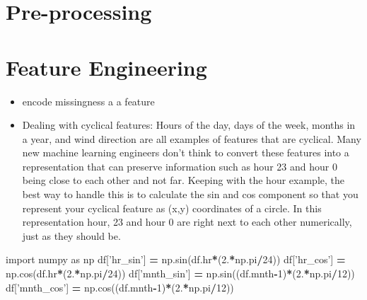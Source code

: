 \documentclass[]{book}
\newenvironment{Shaded}{\begin{snugshade}}{\end{snugshade}}
\newcommand{\DecValTok}[1]{\textcolor[rgb]{0.00,0.00,0.81}{#1}}
\newcommand{\StringTok}[1]{\textcolor[rgb]{0.31,0.60,0.02}{#1}}
\newcommand{\ImportTok}[1]{#1}
\newcommand{\OperatorTok}[1]{\textcolor[rgb]{0.81,0.36,0.00}{\textbf{#1}}}
\newcommand{\NormalTok}[1]{#1}
\theoremstyle{definition}
\theoremstyle{definition}
\theoremstyle{definition}
\theoremstyle{remark}
\begin{document}
\section{Pre-processing}\label{pre-processing}

\section{Feature Engineering}\label{feature-engineering}

\begin{itemize}
\item
  encode missingness a a feature
\item
  Dealing with cyclical features: Hours of the day, days of the week,
  months in a year, and wind direction are all examples of features that
  are cyclical. Many new machine learning engineers don't think to
  convert these features into a representation that can preserve
  information such as hour 23 and hour 0 being close to each other and
  not far. Keeping with the hour example, the best way to handle this is
  to calculate the sin and cos component so that you represent your
  cyclical feature as (x,y) coordinates of a circle. In this
  representation hour, 23 and hour 0 are right next to each other
  numerically, just as they should be.
\end{itemize}

\begin{Shaded}
\begin{Highlighting}[]
\ImportTok{import}\NormalTok{ numpy }\ImportTok{as}\NormalTok{ np}
\NormalTok{df[}\StringTok{'hr_sin'}\NormalTok{] }\OperatorTok{=}\NormalTok{ np.sin(df.hr}\OperatorTok{*}\NormalTok{(}\DecValTok{2}\NormalTok{.}\OperatorTok{*}\NormalTok{np.pi}\OperatorTok{/}\DecValTok{24}\NormalTok{))}
\NormalTok{df[}\StringTok{'hr_cos'}\NormalTok{] }\OperatorTok{=}\NormalTok{ np.cos(df.hr}\OperatorTok{*}\NormalTok{(}\DecValTok{2}\NormalTok{.}\OperatorTok{*}\NormalTok{np.pi}\OperatorTok{/}\DecValTok{24}\NormalTok{))}
\NormalTok{df[}\StringTok{'mnth_sin'}\NormalTok{] }\OperatorTok{=}\NormalTok{ np.sin((df.mnth}\OperatorTok{-}\DecValTok{1}\NormalTok{)}\OperatorTok{*}\NormalTok{(}\DecValTok{2}\NormalTok{.}\OperatorTok{*}\NormalTok{np.pi}\OperatorTok{/}\DecValTok{12}\NormalTok{))}
\NormalTok{df[}\StringTok{'mnth_cos'}\NormalTok{] }\OperatorTok{=}\NormalTok{ np.cos((df.mnth}\OperatorTok{-}\DecValTok{1}\NormalTok{)}\OperatorTok{*}\NormalTok{(}\DecValTok{2}\NormalTok{.}\OperatorTok{*}\NormalTok{np.pi}\OperatorTok{/}\DecValTok{12}\NormalTok{))}
\end{Highlighting}
\end{Shaded}
\end{document}
